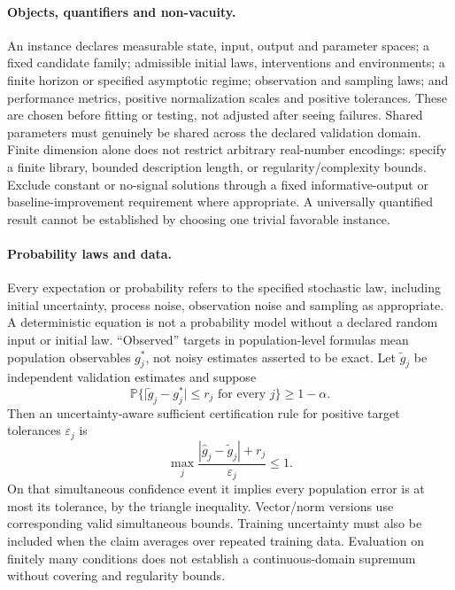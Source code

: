 \documentclass[11pt]{article}
\begin{document}
\paragraph{Objects, quantifiers and non-vacuity.}
An instance declares measurable state, input, output and parameter spaces; a fixed candidate family; admissible initial laws, interventions and environments; a finite horizon or specified asymptotic regime; observation and sampling laws; and performance metrics, positive normalization scales and positive tolerances. These are chosen before fitting or testing, not adjusted after seeing failures. Shared parameters must genuinely be shared across the declared validation domain. Finite dimension alone does not restrict arbitrary real-number encodings: specify a finite library, bounded description length, or regularity/complexity bounds. Exclude constant or no-signal solutions through a fixed informative-output or baseline-improvement requirement where appropriate. A universally quantified result cannot be established by choosing one trivial favorable instance.

\paragraph{Probability laws and data.}
Every expectation or probability refers to the specified stochastic law, including initial uncertainty, process noise, observation noise and sampling as appropriate. A deterministic equation is not a probability model without a declared random input or initial law. ``Observed'' targets in population-level formulas mean population observables $g_j^*$, not noisy estimates asserted to be exact. Let $\widetilde g_j$ be independent validation estimates and suppose
\[
\mathbb{P}\{\lvert\widetilde g_j-g_j^*\rvert\le r_j\text{ for every }j\}\ge1-\alpha.
\]
Then an uncertainty-aware sufficient certification rule for positive target tolerances $\varepsilon_j$ is
\[
\max_j\frac{|\widehat g_j-\widetilde g_j|+r_j}{\varepsilon_j}\le1.
\]
On that simultaneous confidence event it implies every population error is at most its tolerance, by the triangle inequality. Vector/norm versions use corresponding valid simultaneous bounds. Training uncertainty must also be included when the claim averages over repeated training data. Evaluation on finitely many conditions does not establish a continuous-domain supremum without covering and regularity bounds.
\end{document}
